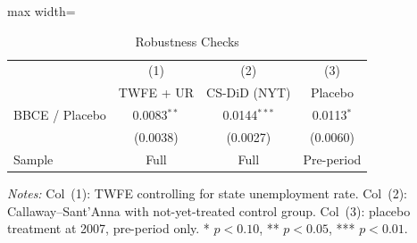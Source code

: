 
\begin{table}[H]
\centering
\caption{Robustness Checks}
\label{tab:robust}
\begin{adjustbox}{max width=\textwidth}
\begin{threeparttable}
\begin{tabular}{lccc}
\toprule
& (1) & (2) & (3) \\
& TWFE + UR & CS-DiD (NYT) & Placebo \\
\midrule
BBCE / Placebo & 0.0083$^{**}$ & 0.0144$^{***}$ & 0.0113$^{*}$ \\
& (0.0038) & (0.0027) & (0.0060) \\[4pt]
Sample & Full & Full & Pre-period \\
\bottomrule
\end{tabular}
\begin{tablenotes}[flushleft]
\small
\item \textit{Notes:} Col~(1): TWFE controlling for state unemployment rate. Col~(2): Callaway--Sant'Anna with not-yet-treated control group. Col~(3): placebo treatment at 2007, pre-period only. * $p<0.10$, ** $p<0.05$, *** $p<0.01$.
\end{tablenotes}
\end{threeparttable}
\end{adjustbox}
\end{table}


